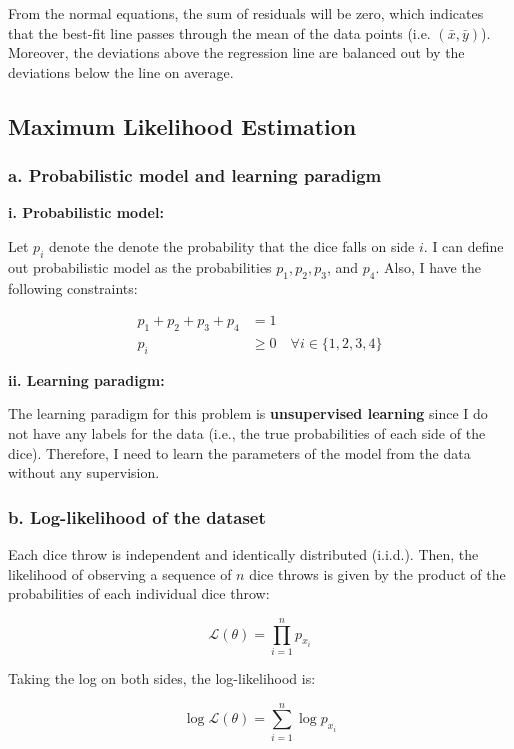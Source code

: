 \documentclass[10pt]{article}
\begin{document}
From the normal equations, the sum of residuals will be zero, which indicates that the best-fit line passes through the mean of the data points (i.e. \((\bar{x}, \bar{y})\)). Moreover, the deviations above the regression line are balanced out by the deviations below the line on average.


\subsection{Maximum Likelihood Estimation}

\subsubsection*{a. Probabilistic model and learning paradigm}

\textbf{i. Probabilistic model:}

Let \(p_i\) denote the denote the probability that the dice falls on side \(i\). I can define out probabilistic model as the probabilities \(p_1, p_2, p_3\), and \(p_4\). Also, I have the following constraints:

\begin{align*}
p_1 + p_2 + p_3 + p_4 &= 1 \\
p_i &\geq 0 \quad \forall i \in \{1, 2, 3, 4\}
\end{align*}

\textbf{ii. Learning paradigm:}

The learning paradigm for this problem is \textbf{unsupervised learning} since I do not have any labels for the data (i.e., the true probabilities of each side of the dice). Therefore, I need to learn the parameters of the model from the data without any supervision.

\subsubsection*{b. Log-likelihood of the dataset}

Each dice throw is independent and identically distributed (i.i.d.). Then, the likelihood of observing a sequence of \(n\) dice throws is given by the product of the probabilities of each individual dice throw:

\[
\mathcal{L}(\theta) = \prod_{i=1}^{n} p_{x_i}
\]

Taking the log on both sides, the log-likelihood is:

\[
\log \mathcal{L}(\theta) = \sum_{i=1}^{n} \log p_{x_i}
\]
\end{document}
